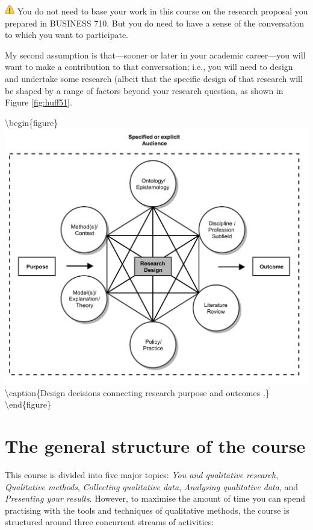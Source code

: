 \documentclass[]{book}
\theoremstyle{definition}
\theoremstyle{definition}
\theoremstyle{definition}
\theoremstyle{remark}
\begin{document}
\includegraphics{images/warning.png} You do not need to base your work
in this course on the research proposal you prepared in BUSINESS 710.
But you do need to have a sense of the conversation to which you want to
participate.

My second assumption is that---sooner or later in your academic
career---you will want to make a contribution to that conversation;
i.e., you will need to design and undertake some research (albeit that
the specific design of that research will be shaped by a range of
factors beyond your research question, as shown in Figure
\ref{fig:huff51}.

\textbackslash{}begin\{figure\}
\includegraphics[width=9.17in]{images/Huff-2009-fig5.1}
\textbackslash{}caption\{Design decisions connecting research purpose
and outcomes \autocite[
p.~86]{huff_2009_designingresearchpublication}.\}\label{fig:huff51}
\textbackslash{}end\{figure\}

\hypertarget{the-general-structure-of-the-course}{%
\section{The general structure of the
course}\label{the-general-structure-of-the-course}}

This course is divided into five major topics: \emph{You and qualitative
research}, \emph{Qualitative methods}, \emph{Collecting qualitative
data}, \emph{Analysing qualitative data}, and \emph{Presenting your
results}. However, to maximise the amount of time you can spend
practising with the tools and techniques of qualitative methods, the
course is structured around three concurrent streams of activities:
\end{document}
